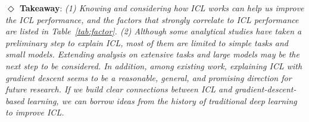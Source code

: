 \textbf{$\Diamond$ Takeaway}: \textit{
(1) Knowing and considering how ICL works can help us improve the ICL performance, and the factors that strongly correlate to ICL performance are listed in Table~\ref{tab:factor}.
(2) 
Although some analytical studies have taken a preliminary step to explain ICL, most of them are limited to simple tasks and small models. 
Extending analysis on extensive tasks and large models may be the next step to be considered. 
In addition, among existing work, explaining ICL with gradient descent seems to be a reasonable, general, and promising direction for future research. 
If we build clear connections between ICL and gradient-descent-based learning, we can borrow ideas from the history of traditional deep learning to improve ICL. 
}